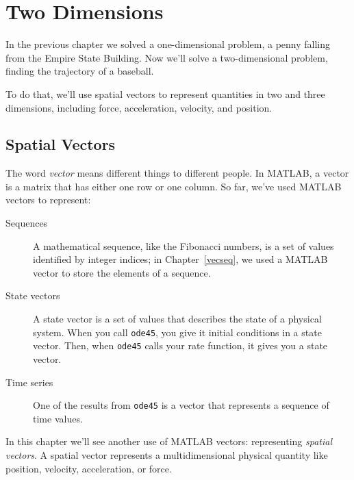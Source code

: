 \chapter{Two Dimensions}

In the previous chapter we solved a one-dimensional problem, a penny falling from the Empire State Building.  Now we'll solve a two-dimensional problem, finding the trajectory of a baseball.


To do that, we'll use spatial vectors to represent quantities in two and three dimensions, including force, acceleration, velocity, and position.

\section{Spatial Vectors}
\label{spacial}

The word {\em vector} means different
things to different people.  In MATLAB, a vector is a matrix that has
either one row or one column.  So far, we've used MATLAB vectors to
represent:

\begin{description}

\item[Sequences] A mathematical sequence, like the Fibonacci numbers, is a set of values identified by integer indices; in Chapter~\ref{vecseq}, we used a MATLAB vector to store the elements of a sequence. 

\item[State vectors] A state vector is a set of values that
describes the state of a physical system.  When you call
\lstinline{ode45}, you give it initial conditions in a state
vector.  Then, when \lstinline{ode45} calls your rate function, it
gives you a state vector.

\item[Time series] One of the results from \lstinline{ode45} is a vector that represents a sequence of time values.

\end{description}


In this chapter we'll see another use of MATLAB vectors: representing
\emph{spatial vectors}.  A spatial vector represents a multidimensional physical quantity like position, velocity, acceleration, or force.


